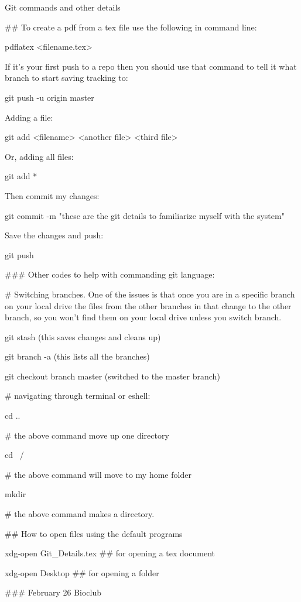 Git commands and other details


## To create a pdf from a tex file use the following in command line:

pdflatex <filename.tex>



If it’s your first push to a repo then you should use that command to tell it what branch to start saving tracking to:

git push -u origin master


Adding a file:

git add <filename> <another file> <third file>

Or, adding all files:

git add *

Then commit my changes:

git commit -m "these are the git details to familiarize myself with the system"

Save the changes and push:

git push

### Other codes to help with commanding git language:

# Switching branches. One of the issues is that once you are in a specific branch on your local drive the files from the other branches in that change to the other branch, so you won't find them on your local drive unless you switch branch.

git stash (this saves changes and cleans up)

git branch -a (this lists all the branches)

git checkout branch master (switched to the master branch)




# navigating through terminal or eshell:

cd ..

# the above command move up one directory

cd ~/

# the above command will move to my home folder

mkdir

# the above command makes a directory.

## How to open files using the default programs

xdg-open Git_Details.tex ## for opening a tex document

xdg-open Desktop ## for opening a folder




### February 26 Bioclub

